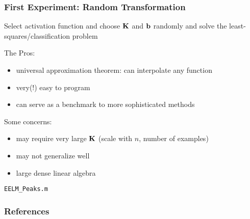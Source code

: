 \documentclass[12pt,fleqn,handout]{beamer}
\begin{document}
\begin{frame}\frametitle{First Experiment: Random Transformation}

Select activation function and choose ${\bf K}$ and ${\bf b}$ randomly and solve the least-squares/classification problem

\bigskip

The Pros:
\begin{itemize}
\item universal approximation theorem: can interpolate any function
\item very(!) easy to program
\item can serve as a benchmark to more sophisticated methods
\end{itemize}

\bigskip

Some concerns:
\begin{itemize}
\item may require very large ${\bf K}$ (scale with $n$, number of examples)
\item may not generalize well
\item large dense linear algebra
\end{itemize}

\begin{center}
	\texttt{EELM\_Peaks.m}
\end{center}
\end{frame}


\begin{frame}[allowframebreaks]
	\frametitle{References}


\end{frame}
\end{document}
